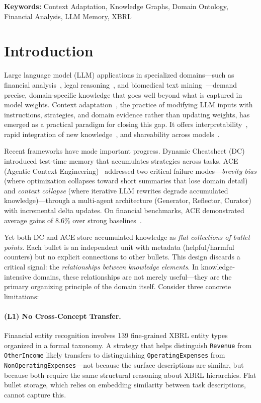 \documentclass[12pt,a4paper]{article}
\begin{document}
\noindent\textbf{Keywords:} Context Adaptation, Knowledge Graphs, Domain Ontology, Financial Analysis, LLM Memory, XBRL

\section{Introduction}

Large language model (LLM) applications in specialized domains---such as financial analysis~\cite{loukas2022finer,wang2025finlora}, legal reasoning~\cite{guha2023legalbench}, and biomedical text mining~\cite{lee2020biobert}---demand precise, domain-specific knowledge that goes well beyond what is captured in model weights. Context adaptation~\cite{ace2025}, the practice of modifying LLM inputs with instructions, strategies, and domain evidence rather than updating weights, has emerged as a practical paradigm for closing this gap. It offers interpretability~\cite{wei2022chain}, rapid integration of new knowledge~\cite{lewis2020retrieval}, and shareability across models~\cite{khot2022decomposed}.

Recent frameworks have made important progress. Dynamic Cheatsheet (DC)~\cite{suzgun2025dynamic} introduced test-time memory that accumulates strategies across tasks. ACE (Agentic Context Engineering)~\cite{ace2025} addressed two critical failure modes---\textit{brevity bias} (where optimization collapses toward short summaries that lose domain detail) and \textit{context collapse} (where iterative LLM rewrites degrade accumulated knowledge)---through a multi-agent architecture (Generator, Reflector, Curator) with incremental delta updates. On financial benchmarks, ACE demonstrated average gains of 8.6\% over strong baselines~\cite{ace2025}.

Yet both DC and ACE store accumulated knowledge as \textit{flat collections of bullet points}. Each bullet is an independent unit with metadata (helpful/harmful counters) but no explicit connections to other bullets. This design discards a critical signal: the \textit{relationships between knowledge elements}. In knowledge-intensive domains, these relationships are not merely useful---they are the primary organizing principle of the domain itself. Consider three concrete limitations:

\paragraph{(L1) No Cross-Concept Transfer.} Financial entity recognition involves 139 fine-grained XBRL entity types~\cite{loukas2022finer} organized in a formal taxonomy. A strategy that helps distinguish \texttt{Revenue} from \texttt{OtherIncome} likely transfers to distinguishing \texttt{OperatingExpenses} from \texttt{NonOperatingExpenses}---not because the surface descriptions are similar, but because both require the same structural reasoning about XBRL hierarchies. Flat bullet storage, which relies on embedding similarity between task descriptions, cannot capture this.
\end{document}
